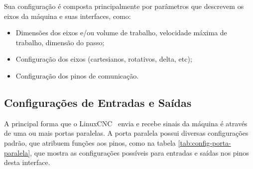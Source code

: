 \documentclass[
	article,			%
	11pt,				%
	oneside,			%
	a4paper,			%
	section=TITLE,		%
	english,			%
	brazil,				%
	sumario=tradicional
	]{abntex2}
\newcommand{\LCNC}{LinuxCNC}
\begin{document}
Sua configuração é composta principalmente por parâmetros que descrevem os eixos da máquina e suas interfaces, como:
\begin{itemize}
    \item Dimensões dos eixos e/ou volume de trabalho, velocidade máxima de trabalho, dimensão do passo;
    \item Configuração dos eixos (cartesianos, rotativos, delta, etc);
    \item Configuração dos pinos de comunicação.
\end{itemize}

\subsection{Configurações de Entradas e Saídas}

A principal forma que o \LCNC~ envia e recebe sinais da máquina é através de uma ou mais portas paralelas. A porta paralela possui diversas configurações padrão, que atribuem funções aos pinos, como na tabela \ref{tab:config-porta-paralela}, que mostra as configurações possíveis para entradas e saídas nos pinos desta interface.
\end{document}
